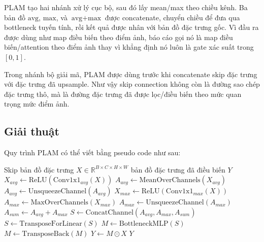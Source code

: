 PLAM tạo hai nhánh xử lý cục bộ, sau đó lấy mean/max theo chiều kênh. Ba bản đồ \(\text{avg}\), \(\text{max}\), và \(\text{avg}+\text{max}\) được concatenate, chuyển chiều để đưa qua bottleneck tuyến tính, rồi kết quả được nhân với bản đồ đặc trưng gốc. Vì đầu ra được dùng như map điều biến theo điểm ảnh, báo cáo gọi nó là map điều biến/attention theo điểm ảnh thay vì khẳng định nó luôn là gate xác suất trong \([0,1]\).

Trong nhánh bộ giải mã, PLAM được dùng trước khi concatenate skip đặc trưng với đặc trưng đã upsample. Như vậy skip connection không còn là đường sao chép đặc trưng thô, mà là đường đặc trưng đã được lọc/điều biến theo mức quan trọng mức điểm ảnh.

\subsection*{Giải thuật}

Quy trình PLAM có thể viết bằng pseudo code như sau:

\begin{algorithm}[H]
\caption{Thuật toán Module chú ý mức điểm ảnh (PLAM)}
\label{alg:plam}
\begin{algorithmic}[1]
\Require Skip bản đồ đặc trưng \(X\in\mathbb{R}^{B\times C\times H\times W}\)
\Ensure bản đồ đặc trưng đã điều biến \(Y\)
\State \(X_{avg} \gets \mathrm{ReLU}(\mathrm{Conv1x1}_{avg}(X))\) 
\State \(A_{avg} \gets \mathrm{MeanOverChannels}(X_{avg})\) 
\State \(A_{avg} \gets \mathrm{UnsqueezeChannel}(A_{avg})\) 
\State \(X_{max} \gets \mathrm{ReLU}(\mathrm{Conv1x1}_{max}(X))\) 
\State \(A_{max} \gets \mathrm{MaxOverChannels}(X_{max})\) 
\State \(A_{max} \gets \mathrm{UnsqueezeChannel}(A_{max})\) 
\State \(A_{sum} \gets A_{avg}+A_{max}\) 
\State \(S \gets \mathrm{ConcatChannel}(A_{avg},A_{max},A_{sum})\) 
\State \(S \gets \mathrm{TransposeForLinear}(S)\) 
\State \(M \gets \mathrm{BottleneckMLP}(S)\) 
\State \(M \gets \mathrm{TransposeBack}(M)\) 
\State \(Y \gets M \odot X\) 
\State \Return \(Y\) 
\end{algorithmic}
\end{algorithm}



